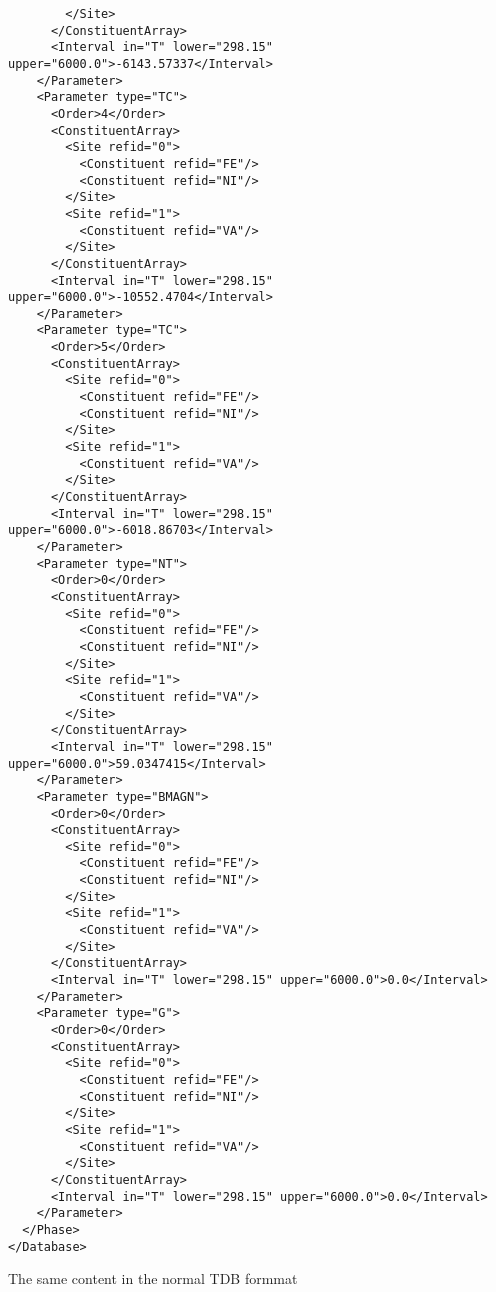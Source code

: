 \documentclass[12pt]{article}
\begin{document}
{\begin{verbatim}
        </Site>
      </ConstituentArray>
      <Interval in="T" lower="298.15" upper="6000.0">-6143.57337</Interval>
    </Parameter>
    <Parameter type="TC">
      <Order>4</Order>
      <ConstituentArray>
        <Site refid="0">
          <Constituent refid="FE"/>
          <Constituent refid="NI"/>
        </Site>
        <Site refid="1">
          <Constituent refid="VA"/>
        </Site>
      </ConstituentArray>
      <Interval in="T" lower="298.15" upper="6000.0">-10552.4704</Interval>
    </Parameter>
    <Parameter type="TC">
      <Order>5</Order>
      <ConstituentArray>
        <Site refid="0">
          <Constituent refid="FE"/>
          <Constituent refid="NI"/>
        </Site>
        <Site refid="1">
          <Constituent refid="VA"/>
        </Site>
      </ConstituentArray>
      <Interval in="T" lower="298.15" upper="6000.0">-6018.86703</Interval>
    </Parameter>
    <Parameter type="NT">
      <Order>0</Order>
      <ConstituentArray>
        <Site refid="0">
          <Constituent refid="FE"/>
          <Constituent refid="NI"/>
        </Site>
        <Site refid="1">
          <Constituent refid="VA"/>
        </Site>
      </ConstituentArray>
      <Interval in="T" lower="298.15" upper="6000.0">59.0347415</Interval>
    </Parameter>
    <Parameter type="BMAGN">
      <Order>0</Order>
      <ConstituentArray>
        <Site refid="0">
          <Constituent refid="FE"/>
          <Constituent refid="NI"/>
        </Site>
        <Site refid="1">
          <Constituent refid="VA"/>
        </Site>
      </ConstituentArray>
      <Interval in="T" lower="298.15" upper="6000.0">0.0</Interval>
    </Parameter>
    <Parameter type="G">
      <Order>0</Order>
      <ConstituentArray>
        <Site refid="0">
          <Constituent refid="FE"/>
          <Constituent refid="NI"/>
        </Site>
        <Site refid="1">
          <Constituent refid="VA"/>
        </Site>
      </ConstituentArray>
      <Interval in="T" lower="298.15" upper="6000.0">0.0</Interval>
    </Parameter>
  </Phase>
</Database>
\end{verbatim}
}

The same content in the normal TDB formmat
\end{document}
